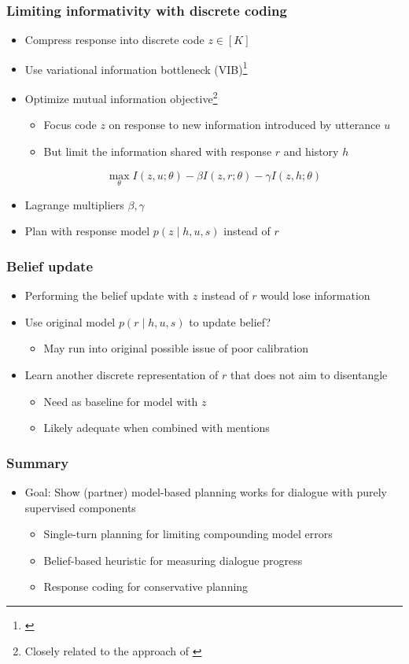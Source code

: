 \documentclass{beamer}
\begin{document}
\begin{frame}
\frametitle{Limiting informativity with discrete coding}
\begin{itemize}
\item Compress response into discrete code $z \in [K]$
\item Use variational information bottleneck (VIB)\footnote{\citet{vib}}
\item Optimize mutual information objective\footnote{Closely related to the approach of \citet{li}}
    \begin{itemize}
    \item Focus code $z$ on response to new information introduced by utterance $u$
    \item But limit the information shared with response $r$ and history $h$
    \end{itemize}
$$\max_\theta I(z, u; \theta) - \beta I(z, r; \theta) - \gamma I(z, h; \theta)$$
\item Lagrange multipliers $\beta,\gamma$
\item Plan with response model $p(z \mid h, u, s)$ instead of $r$
\end{itemize}
\end{frame}

\begin{frame}
\frametitle{Belief update}
\begin{itemize}
\item Performing the belief update with $z$ instead of $r$ would lose information
\item Use original model $p(r \mid h, u, s)$ to update belief?
    \begin{itemize}
    \item May run into original possible issue of poor calibration
    \end{itemize}
\item Learn another discrete representation of $r$ that does not aim
    to disentangle
    \begin{itemize}
    \item Need as baseline for model with $z$
    \item Likely adequate when combined with mentions
    \end{itemize}
\end{itemize}
\end{frame}

\begin{frame}
\frametitle{Summary}
\begin{itemize}
\item Goal: Show (partner) model-based planning works for dialogue with
    purely supervised components
    \begin{itemize}
    \item Single-turn planning for limiting compounding model errors
    \item Belief-based heuristic for measuring dialogue progress
    \item Response coding for conservative planning
    \end{itemize}
\end{itemize}
\end{frame}
\end{document}
